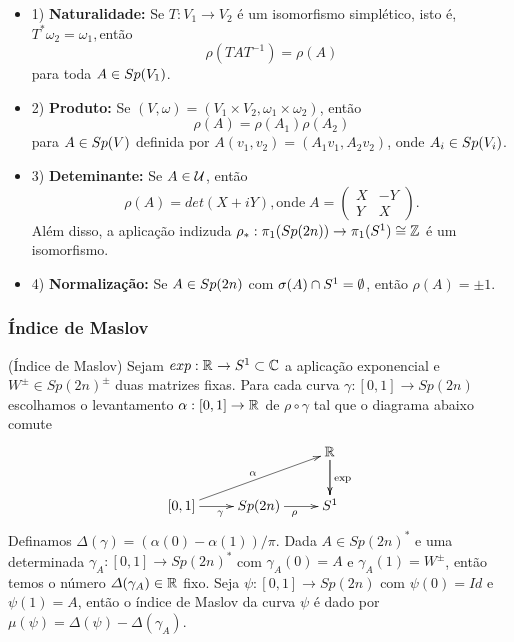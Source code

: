 \documentclass{beamer}
\begin{document}
	\begin{frame}
		\begin{itemize}
			\item 1) \textbf{Naturalidade:}  Se $T:V_{1} \to V_{2}$ é um isomorfismo simplético, isto é, $T^{*}\omega_{2} = \omega_{1}, $então 
			$$
			\rho(TAT^{-1}) = \rho(A)
			$$
			para toda $A\in Sp(V_{1})$.
			
			\item 2) \textbf{Produto:} Se $(V,\omega) = (V_{1}\times V_{2},\omega_{1}\times \omega_{2})$, então
			$$
			\rho(A) = \rho(A_{1})\rho(A_{2})
			$$
			para $A\in Sp(V)$ definida por $A(v_{1}, v_{2})=(A_{1}v_{1}, A_{2}v_{2})$, onde $A_{i} \in Sp(V_{i})$.
			
			\item 3) \textbf{Deteminante:} Se $A\in \mathcal{U}$, então 
			$$
			\rho(A) = det(X+iY), \text{onde} \;	
			A=\left(
			\begin{array}{cc}
			X & -Y					\\
			Y & X
			\end{array}
			\right).
			$$
			Além disso, a aplicação indizuda $\rho_{*}: \pi_{1}(Sp(2n)) \to \pi_{1}(S^{1}) \cong \mathbb{Z}$ é um isomorfismo.
			
			\item 4) \textbf{Normalização:} Se $A \in Sp(2n)$ com $\sigma(A)\cap S^{1} = \emptyset$, então $\rho(A) = \pm 1$.
			
		\end{itemize}
	\end{frame}
	
	\begin{frame}
		\frametitle{Índice de Maslov}
		\begin{definicao}
			(Índice de Maslov) Sejam $exp:\mathbb{R}^{} \to S^{1} \subset \mathbb{C}$ a aplicação exponencial e $W^{\pm} \in Sp(2n)^{\pm}$ duas matrizes fixas. Para cada curva $\gamma:[0,1] \to Sp(2n)$ escolhamos o levantamento $\alpha:[0,1] \to \mathbb{R}^{}$ de $\rho\circ \gamma$ tal que o diagrama abaixo comute
			$$
			\xymatrix{
				& & \real{}\ar[d]\ar[d]^{\text{exp}}
				\\
				[0,1 ]\ar[urr]^{\alpha} \ar[r]_{\gamma} & Sp(2n) \ar[r]_{\rho} & S^{1}
			}
			$$	
			Definamos $\varDelta(\gamma) = (\alpha(0) - \alpha(1))/\pi$. Dada $A \in Sp(2n)^{*}$ e uma determinada $\gamma_{A}:[0,1] \to Sp(2n)^{*}$ com $\gamma_{A}(0) = A$ e $\gamma_{A}(1) = W^{\pm}$, então temos o número $\varDelta(\gamma_{A}) \in \mathbb{R}^{}$ fixo.
			Seja $\psi:[0,1] \to Sp(2n)$ com $\psi(0)=Id$ e $\psi(1)=A$, então o índice de Maslov da curva $\psi$ é dado por $\mu(\psi) = \varDelta(\psi) - \varDelta(\gamma_{A})$.
			
		\end{definicao}
		
	\end{frame}
	
\end{document}
